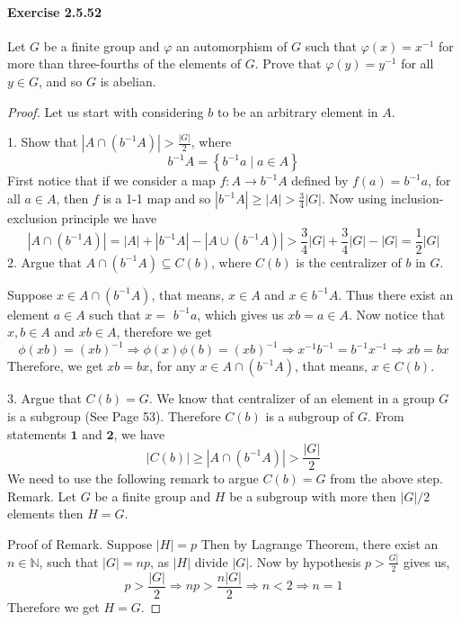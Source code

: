 \documentclass{article}
\begin{document}
\paragraph{Exercise 2.5.52} Let $G$ be a finite group and $\varphi$ an automorphism of $G$ such that $\varphi(x) = x^{-1}$ for more than three-fourths of the elements of $G$. Prove that $\varphi(y) = y^{-1}$ for all $y \in G$, and so $G$ is abelian.
\begin{proof}
Let us start with considering $b$ to be an arbitrary element in $A$. 

1. Show that $\left|A \cap\left(b^{-1} A\right)\right|>\frac{|G|}{2}$, where
$$
b^{-1} A=\left\{b^{-1} a \mid a \in A\right\}
$$
First notice that if we consider a map $f: A \rightarrow b^{-1} A$ defined by $f(a)=b^{-1} a$, for all $a \in A$, then $f$ is a 1-1 map and so $\left|b^{-1} A\right| \geq|A|>\frac{3}{4}|G|$. Now using inclusion-exclusion principle we have
$$
\left|A \cap\left(b^{-1} A\right)\right|=|A|+\left|b^{-1} A\right|-\left|A \cup\left(b^{-1} A\right)\right|>\frac{3}{4}|G|+\frac{3}{4}|G|-|G|=\frac{1}{2}|G|
$$
2. Argue that $A \cap\left(b^{-1} A\right) \subseteq C(b)$, where $C(b)$ is the centralizer of $b$ in $G$.

Suppose $x \in A \cap\left(b^{-1} A\right)$, that means, $x \in A$ and $x \in b^{-1} A$. Thus there exist an element $a \in A$ such that $x=$ $b^{-1} a$, which gives us $x b=a \in A$. Now notice that $x, b \in A$ and $x b \in A$, therefore we get
$$
\phi(x b)=(x b)^{-1} \Longrightarrow \phi(x) \phi(b)=(x b)^{-1} \Longrightarrow x^{-1} b^{-1}=b^{-1} x^{-1} \Longrightarrow x b=b x
$$
Therefore, we get $x b=b x$, for any $x \in A \cap\left(b^{-1} A\right)$, that means, $x \in C(b)$.

3. Argue that $C(b)=G$.
We know that centralizer of an element in a group $G$ is a subgroup (See Page 53). Therefore $C(b)$ is a subgroup of $G$. From statements $\mathbf{1}$ and $\mathbf{2}$, we have
$$
|C(b)| \geq\left|A \cap\left(b^{-1} A\right)\right|>\frac{|G|}{2}
$$
We need to use the following remark to argue $C(b)=G$ from the above step.
Remark. Let $G$ be a finite group and $H$ be a subgroup with more then $|G| / 2$ elements then $H=G$.

Proof of Remark. Suppose $|H|=p$ Then by Lagrange Theorem, there exist an $n \in \mathbb{N}$, such that $|G|=n p$, as $|H|$ divide $|G|$. Now by hypothesis $p>\frac{G]}{2}$ gives us,
$$
p>\frac{|G|}{2} \Longrightarrow n p>\frac{n|G|}{2} \Longrightarrow n<2 \Longrightarrow n=1
$$
Therefore we get $H=G$.


\end{proof}
\end{document}
